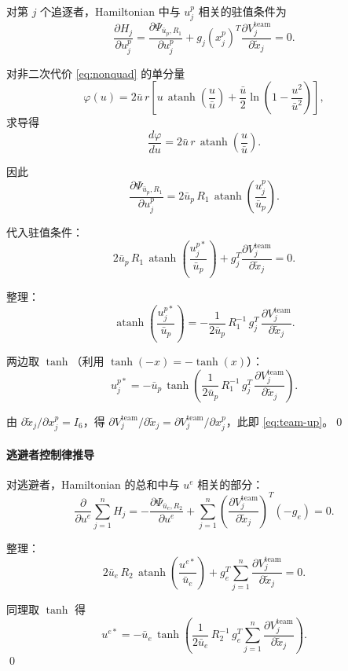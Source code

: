 \documentclass[12pt,a4paper]{ctexart}
\DeclareMathOperator{\atanh}{atanh}
\begin{document}
对第 $j$ 个追逐者，Hamiltonian 中与 $u_j^p$ 相关的驻值条件为
\[
\frac{\partial H_j}{\partial u_j^p} = \frac{\partial \Psi_{\bar{u}_p, R_1}}{\partial u_j^p} + g_j(x_j^p)^T \frac{\partial V_j^{\mathrm{team}}}{\partial \tilde{x}_j} = 0.
\]

对非二次代价 \eqref{eq:nonquad} 的单分量
\[
\varphi(u) = 2\bar{u}\,r\left[u\,\atanh\!\left(\frac{u}{\bar{u}}\right) + \frac{\bar{u}}{2}\ln\!\left(1 - \frac{u^2}{\bar{u}^2}\right)\right],
\]
求导得
\[
\frac{d\varphi}{du} = 2\bar{u}\,r\,\atanh\!\left(\frac{u}{\bar{u}}\right).
\]

因此
\[
\frac{\partial\Psi_{\bar{u}_p, R_1}}{\partial u_j^p} = 2\bar{u}_p\,R_1\,\atanh\!\left(\frac{u_j^p}{\bar{u}_p}\right).
\]

代入驻值条件：
\[
2\bar{u}_p\,R_1\,\atanh\!\left(\frac{u_j^{p*}}{\bar{u}_p}\right) + g_j^T \frac{\partial V_j^{\mathrm{team}}}{\partial \tilde{x}_j} = 0.
\]

整理：
\[
\atanh\!\left(\frac{u_j^{p*}}{\bar{u}_p}\right) = -\frac{1}{2\bar{u}_p}\,R_1^{-1}\,g_j^T\,\frac{\partial V_j^{\mathrm{team}}}{\partial \tilde{x}_j}.
\]

两边取 $\tanh$（利用 $\tanh(-x) = -\tanh(x)$）：
\[
u_j^{p*} = -\bar{u}_p\,\tanh\!\left(\frac{1}{2\bar{u}_p}\,R_1^{-1}\,g_j^T\,\frac{\partial V_j^{\mathrm{team}}}{\partial \tilde{x}_j}\right).
\]

由 $\partial\tilde{x}_j/\partial x_j^p = I_6$，得 $\partial V_j^{\mathrm{team}}/\partial\tilde{x}_j = \partial V_j^{\mathrm{team}}/\partial x_j^p$，此即 \eqref{eq:team-up}。\qed

\bigskip

\paragraph{逃避者控制律推导}

对逃避者，Hamiltonian 的总和中与 $u^e$ 相关的部分：
\[
\frac{\partial}{\partial u^e}\sum_{j=1}^{n} H_j = -\frac{\partial\Psi_{\bar{u}_e, R_2}}{\partial u^e} + \sum_{j=1}^{n}\left(\frac{\partial V_j^{\mathrm{team}}}{\partial\tilde{x}_j}\right)^{\!T}(-g_e) = 0.
\]

整理：
\[
2\bar{u}_e\,R_2\,\atanh\!\left(\frac{u^{e*}}{\bar{u}_e}\right) + g_e^T \sum_{j=1}^{n}\frac{\partial V_j^{\mathrm{team}}}{\partial\tilde{x}_j} = 0.
\]

同理取 $\tanh$ 得
\[
u^{e*} = -\bar{u}_e\,\tanh\!\left(\frac{1}{2\bar{u}_e}\,R_2^{-1}\,g_e^T \sum_{j=1}^{n}\frac{\partial V_j^{\mathrm{team}}}{\partial\tilde{x}_j}\right).
\]
\qed
\end{document}
